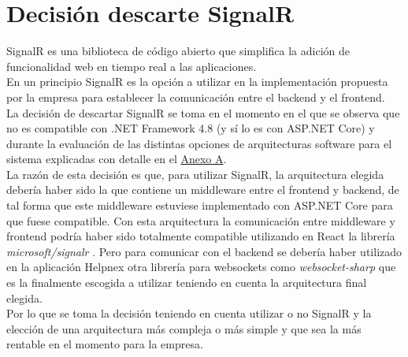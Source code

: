 \chapter{Decisión descarte SignalR}
\label{anexo-b}


SignalR \cite{signalr} es una biblioteca de código abierto que simplifica la adición de funcionalidad web en tiempo real a las aplicaciones.\\

En un principio SignalR es la opción a utilizar en la implementación propuesta por la empresa  para establecer la comunicación entre el backend y el frontend.\\

La decisión de descartar SignalR se toma en el momento en el que se observa que no es compatible con .NET Framework 4.8 (y sí lo es con ASP.NET Core) y durante la evaluación de las distintas opciones de arquitecturas software para el sistema explicadas con detalle en el \hyperref[anexo-a]{Anexo A}.\\

La razón de esta decisión es que, para utilizar SignalR, la arquitectura elegida debería haber sido la que contiene un middleware entre el frontend y backend, de tal forma que este middleware estuviese implementado con ASP.NET Core para que fuese compatible.
Con esta arquitectura la comunicación entre middleware y frontend podría haber sido totalmente compatible utilizando en React la librería \textit{microsoft/signalr} \cite{microsoft/signalr}. Pero para comunicar con el backend se debería haber utilizado en la aplicación Helpnex otra librería para websockets como \textit{websocket-sharp} \cite{websocket-sharp} que es la finalmente escogida a utilizar teniendo en cuenta la arquitectura final elegida.\\

Por lo que se toma la decisión teniendo en cuenta utilizar o no SignalR y la elección de una arquitectura más compleja o más simple y que sea la más rentable en el momento para la empresa.
